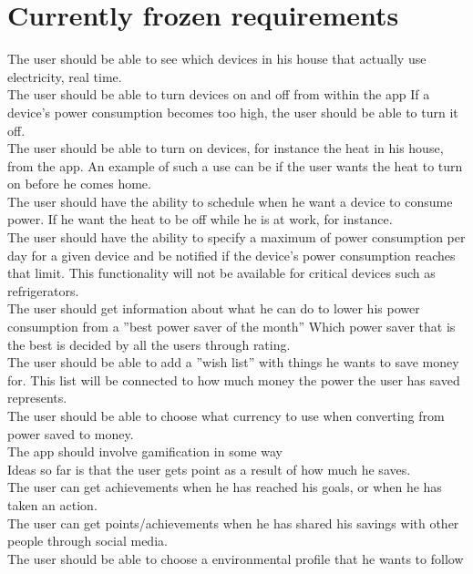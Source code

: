 \chapter{Currently frozen requirements}

The user should be able to see which devices in his house that actually use electricity, real time.\\
The user should be able to turn devices on and off from within the app
If a device's power consumption becomes too high, the user should be able to turn it off.\\
The user should be able to turn on devices, for instance the heat in his house, from the app. An example of such a use can be if the user wants the heat to turn on before he comes home.\\
The user should have the ability to schedule when he want a device to consume power. If he want the heat to be off while he is at work, for instance. \\
The user should have the ability to specify a maximum of power consumption per day for a given device and be notified if the device's power consumption reaches that limit. This functionality will not be available for critical devices such as refrigerators. \\
The user should get information about what he can do to lower his power consumption from a ''best power saver of the month'' Which power saver that is the best is decided by all the users through rating.\\
The user should be able to add a ''wish list'' with things he wants to save money for. This list will be connected to how much money the power the user has saved represents.\\
The user should be able to choose what currency to use when converting from power saved to money.\\
The app should involve gamification in some way\\
Ideas so far is that the user gets point as a result of how much he saves.\\
The user can get achievements when he has reached his goals, or when he has taken an action.\\
The user can get points/achievements when he has shared his savings with other people through social media.\\
The user should be able to choose a environmental profile that he wants to follow
\\
